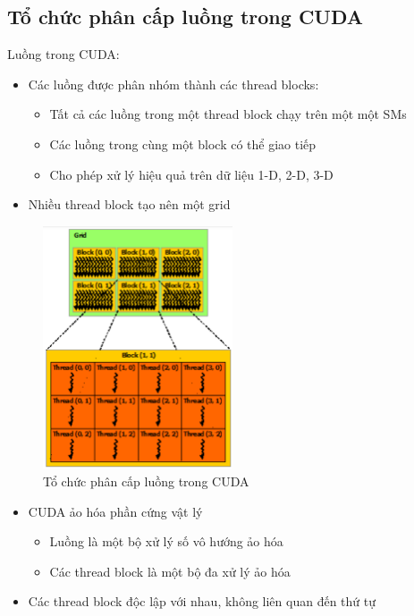 \documentclass[14pt, a4paper]{article}
\numberwithin{equation}{section}
\numberwithin{figure}{section}
\numberwithin{dl}{section}
\numberwithin{md}{section}
\numberwithin{bd}{section}
\numberwithin{dn}{section}
\numberwithin{hq}{section}
\begin{document}
\subsection{Tổ chức phân cấp luồng trong CUDA}

Luồng trong CUDA:

\begin{itemize}
    \item Các luồng được phân nhóm thành các thread blocks:
    \begin{itemize}
        \item Tất cả các luồng trong một thread block chạy trên một một SMs
        \item Các luồng trong cùng một block có thể giao tiếp
        \item Cho phép xử lý hiệu quả trên dữ liệu 1-D, 2-D, 3-D
    \end{itemize}
    \item Nhiều thread block tạo nên một grid
\end{itemize}

\begin{figure}[H]
    \centering
    \includegraphics[width=0.5\textwidth]{figures/CUDA/Thread_Hierachy.png}
    \caption{Tổ chức phân cấp luồng trong CUDA}
\end{figure}

\begin{itemize}
    \item CUDA ảo hóa phần cứng vật lý
    \begin{itemize}
        \item Luồng là một bộ xử lý số vô hướng ảo hóa
        \item Các thread block là một bộ đa xử lý ảo hóa
    \end{itemize}
    \item Các thread block độc lập với nhau, không liên quan đến thứ tự
\end{itemize}
\end{document}
